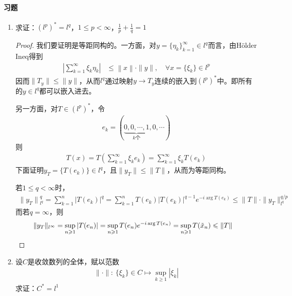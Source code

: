	\paragraph{习题}
	\begin{enumerate}[leftmargin=2cm, label=\arabic*]
		\item 求证：$(l^p)^* = l^q$，$1\leqslant p<\infty$，$\frac{1}{p} + \frac{1}{q} = 1$
		\begin{proof}
			我们要证明是等距同构的。一方面，对$y = \{\eta_k\}_{k=1}^{\infty}\in l^q$而言，由Hölder Ineq得到
			\begin{align*}
				\left|\sum\limits_{k=1}^{\infty} \xi_k \eta_k \right| &\leqslant \left\|x \right\|\cdot \|y\|,\quad \forall x = \{\xi_k\}\in l^p
			\end{align*}
			因而$\|T_y\| \leqslant \|y\|$，从而$l^q$通过映射$y\to T_y$连续的嵌入到$(l^p)^*$中。即所有的$y\in l^q$都可以嵌入进去。
			
			另一方面，对$T\in (l^p)^*$，令
			\begin{align*}
				e_k = (\underbrace{0,0,\cdots,1}\limits_{k\text{个}},0,\cdots)
			\end{align*}
			则
			\begin{align*}
				T(x) = T\left(\sum\limits_{k=1}^{\infty}\xi_k e_k\right) = \sum\limits_{k=1}^{\infty} \xi_k T(e_k)
			\end{align*}
			下面证明$y_T = \{T(e_k)\}\in l^q$，且$\|y_T\| \leqslant \|T\|$，从而为等距同构。
			
			若$1\leqslant q<\infty$时，
			\begin{align*}
				\|y_T\|{}_{l^q}^q = \sum\limits_{k=1}^n |T(e_k)|^q = \sum\limits_{k=1}^n T(e_k) |T(e_k)|^{q-1} e^{-i\arg T(e_k)} \leqslant \|T\| \cdot\|y_T\|_{l^q}^{q/p} 
			\end{align*}
			而若$q = \infty$，则
			\begin{align*}
				\|y_T\|_{l^{\infty}} &= \sup\limits_{n\geqslant 1} |T(e_n)| = \sup\limits_{n\geqslant 1} T(e_n) e^{-i\arg T(e_n)} = \sup\limits_{n\geqslant 1} T(\Tilde{x}_n) \leqslant \|T\|
			\end{align*}
		\end{proof}
		
		\item 设$C$是收敛数列的全体，赋以范数
		\begin{align*}
			\|\cdot\|:\ \{\xi_k\}\in C\mapsto \sup\limits_{k\geqslant 1} |\xi_k|
		\end{align*}
		求证：$C^* = l^1$
		

\end{enumerate}
